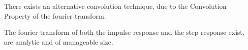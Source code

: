 \documentclass[fleqn,10pt]{paper}
\begin{document}
There exists an alternative convolution technique, due to the Convolution Property of the fourier transform.

The fourier transform of both the impulse response and the step response exist, are analytic and of manageable size.








\end{document}
